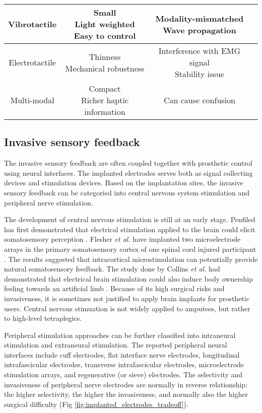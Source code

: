 \begin{table}[htp!]
\begin{tabular}{ |c|c|c|c|c|}
       \hline
       \multicolumn{2}{|c|}{Vibrotactile}      & \shortstack{Small \\Light weighted \\Easy to control}         & \shortstack{Modality-mismatched\\Wave propagation} \\
       \hline
       \multicolumn{2}{|c|}{Electrotactile}     & \shortstack{Thinness \\ Mechanical robustness}  & \shortstack{Interference with EMG signal\\Stability issue}  \\
       \hline
       \multicolumn{2}{|c|}{Multi-modal} &  \shortstack{Compact \\Richer haptic information} & Can cause confusion   \\
       \hline
    \end{tabular}
\end{table}


\subsection{Invasive sensory feedback}
The invasive sensory feedback are often coupled together with prosthetic control using neural interfaces. The implanted electrodes serves both as signal collecting devices and stimulation devices.
Based on the implantation sites, the invasive sensory feedback can be categoried into central nervous system stimulation and peripheral nerve stimulation.  

The development of central nervous stimulation is still at an early stage. Penfiled has first demonstrated that electrical stimulation applied to the brain could elicit somatosensory perception \cite{penfield1937somatic}. 
Flesher \textit{et al.} have implanted two microelectrode arrays in the primary somatosensory cortex of one spinal cord injured participant \cite{flesher2016intracortical}.  The results suggested that intracortical microstimulation can potentially provide natural somatosensory feedback. The study done by Collins \textit{et al.} had demonstrated that electrical brain stimulation could also induce body ownership feeling towards an artificial limb \cite{collins2016ownership}. Because of its high surgical risks and invasiveness, it is sometimes not justified to apply brain implants for prosthetic users. Central nervous stimuation is not widely applied to amputees, but rather to high-level tetraplegics.

Peripheral stimulation approaches can be further classified into intraneural stimulation and extraneural stimulation. The reported peripheral neural interfaces include cuff electrodes, flat interface nerve electrodes, longitudinal intrafascicular electrodes, transverse intrafascicular electrodes, microelectrode stimulation arrays, and regenerative (or sieve) electrodes. The selectivity and invasiveness of peripheral nerve electrodes are normally in reverse relationship: the higher selectivity, the higher the invasiveness, and normally also the higher surgical difficulty (Fig \ref{fig:implanted_electrodes_tradeoff}). 


